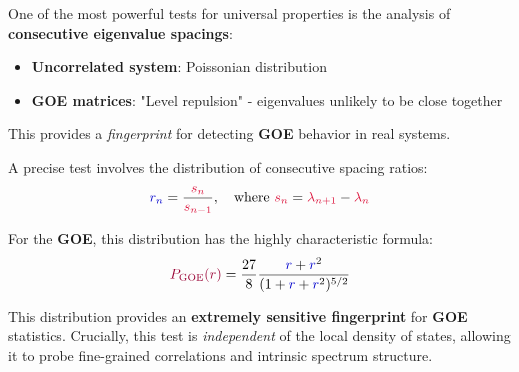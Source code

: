 \documentclass[a4paper]{article}
\theoremstyle{plain}
\theoremstyle{definition}
\theoremstyle{remark}
\begin{document}
\begin{tcolorbox}[colback=green!10,colframe=green!60!black,title={\textbf{🔬 GENERAL REMARK: Level Spacing Analysis}},enhanced,drop shadow]
One of the most powerful tests for universal properties is the analysis of \textbf{consecutive eigenvalue spacings}:

\begin{itemize}
\item \textbf{Uncorrelated system}: Poissonian distribution
\item \textcolor{purple!80!black}{\textbf{GOE matrices}}: "Level repulsion" - eigenvalues unlikely to be close together
\end{itemize}

This provides a \textit{fingerprint} for detecting \textcolor{purple!80!black}{\textbf{GOE}} behavior in real systems.
\end{tcolorbox}

\begin{tcolorbox}[colback=blue!10,colframe=blue!60!black,title={\textbf{🎯 THEOREM: GOE Ratio Distribution}},enhanced,drop shadow]
A precise test involves the distribution of consecutive spacing ratios:
\begin{equation}
\textcolor{blue!80!black}{r_n} = \frac{\textcolor{kernelcolor}{s_n}}{\textcolor{kernelcolor}{s_{n-1}}}, \quad \text{where } \textcolor{kernelcolor}{s_n} = \textcolor{kernelcolor}{\lambda_{n+1}} - \textcolor{kernelcolor}{\lambda_n}
\end{equation}

For the \textcolor{purple!80!black}{\textbf{GOE}}, this distribution has the highly characteristic formula:
\begin{equation}
\textcolor{purple!80!black}{P_{\text{GOE}}(r)} = \frac{27}{8} \frac{\textcolor{blue!80!black}{r} + \textcolor{blue!80!black}{r}^2}{(1 + \textcolor{blue!80!black}{r} + \textcolor{blue!80!black}{r}^2)^{5/2}}
\label{eq:goe_ratio_dist}
\end{equation}
\end{tcolorbox}

\begin{tcolorbox}[colback=green!10,colframe=green!60!black,title={\textbf{🎯 GENERAL REMARK: Sensitivity of GOE Test}},enhanced,drop shadow]
This distribution provides an \textbf{extremely sensitive fingerprint} for \textcolor{purple!80!black}{\textbf{GOE}} statistics. Crucially, this test is \textit{independent} of the local density of states, allowing it to probe fine-grained correlations and intrinsic spectrum structure.
\end{tcolorbox}
\end{document}

